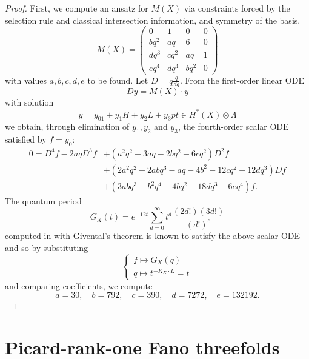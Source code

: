 \documentclass[11pt]{amsart}
\theoremstyle{plain}
\numberwithin{equation}{section}
\theoremstyle{definition}
\theoremstyle{remark}
\begin{document}
\begin{proof}
    First, we compute an ansatz for $M(X)$ via constraints forced by the selection rule and classical intersection information, and symmetry of the basis.
    \[
    M(X) = 
    \begin{pmatrix}
        0 & 1 & 0 & 0 \\
        bq^2 & aq & 6 & 0 \\
        dq^3 & cq^2 & aq & 1 \\
        eq^4 & dq^4 & bq^2 & 0
    \end{pmatrix}
    \]
    with values $a,b,c,d,e$ to be found. Let $D = q \frac{q}{dq}$. From the first-order linear ODE
    \[
    Dy  = M(X)\cdot  y
    \]
    with solution 
    \[
     y = y_01 +y_1H + y_2 L + y_3pt \in H^*(X) \otimes \Lambda
    \]
    we obtain, through elimination of $y_1,y_2$ and $y_3$, the fourth-order scalar ODE satisfied by $f =y_0$:
    \[
    \begin{split}
    0 = D^4f -2aqD^3f & + (a^2q^2 -3aq -2bq^2-6cq^2)D^2f\\ 
    & + (2a^2q^2 + 2abq^3 -aq -4b^2 -12cq^2-12dq^3)Df \\
    & + (3abq^3 + b^2q^4 -4bq^2 -18dq^3 -6eq^4)f.
    \end{split}
    \] 
    The quantum period 
    \[
    G_X(t) = e^{-12t} \sum_{d=0}^{\infty} t^d \frac{(2d!)(3d!)}{(d!)^6}
    \]
    computed in \cite{CCGK16} with Givental's theorem is known to satisfy the above scalar ODE \cite{CCGGK14} and so by substituting
    \[
    \begin{cases}
        f\mapsto G_X(q)\\ q\mapsto t^{-K_X\cdot L} = t
    \end{cases}\]
    and comparing coefficients, we compute 
    \[
    a = 30,\quad  b = 792, \quad  c= 390, \quad  d= 7272,  \quad e = 132192.
    \]
    
\end{proof}
\section{Picard-rank-one Fano threefolds}
\label{sRankOneFanoThreefolds}
\end{document}
